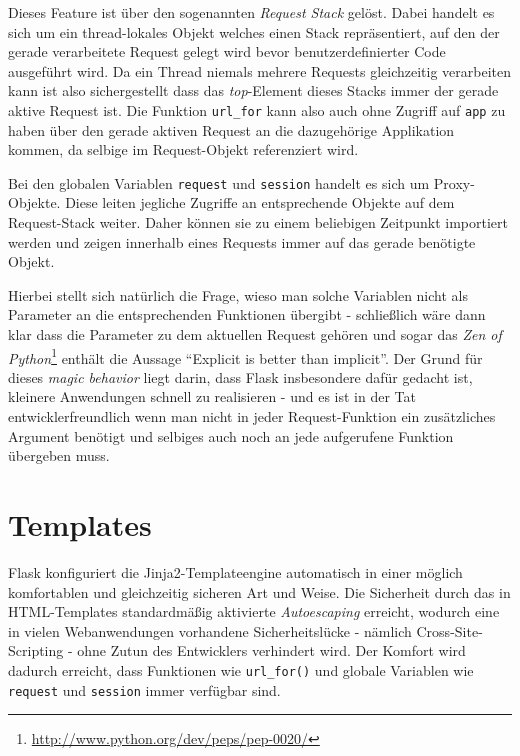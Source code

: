 Dieses Feature ist über den sogenannten \emph{Request Stack} gelöst. Dabei handelt es sich um ein
thread-lokales Objekt welches einen Stack repräsentiert, auf den der gerade verarbeitete Request
gelegt wird bevor benutzerdefinierter Code ausgeführt wird. Da ein Thread niemals mehrere Requests
gleichzeitig verarbeiten kann ist also sichergestellt dass das \emph{top}-Element dieses Stacks
immer der gerade aktive Request ist. Die Funktion \lstinline{url_for} kann also auch ohne Zugriff
auf \lstinline{app} zu haben über den gerade aktiven Request an die dazugehörige Applikation kommen,
da selbige im Request-Objekt referenziert wird.

Bei den globalen Variablen \lstinline{request} und \lstinline{session} handelt es sich um
Proxy-Objekte. Diese leiten jegliche Zugriffe an entsprechende Objekte auf dem Request-Stack weiter.
Daher können sie zu einem beliebigen Zeitpunkt importiert werden und zeigen innerhalb eines Requests
immer auf das gerade benötigte Objekt.

Hierbei stellt sich natürlich die Frage, wieso man solche Variablen nicht als Parameter an die
entsprechenden Funktionen übergibt - schließlich wäre dann klar dass die Parameter zu dem aktuellen
Request gehören und sogar das \emph{Zen of
Python}\footnote{\href{http://www.python.org/dev/peps/pep-0020/}{http://www.python.org/dev/peps/pep-0020/}}
enthält die Aussage \enquote{Explicit is better than implicit}. Der Grund für dieses \emph{magic
behavior} liegt darin, dass Flask insbesondere dafür gedacht ist, kleinere Anwendungen schnell zu
realisieren - und es ist in der Tat entwicklerfreundlich wenn man nicht in jeder Request-Funktion
ein zusätzliches Argument benötigt und selbiges auch noch an jede aufgerufene Funktion übergeben
muss.

\section{Templates}

Flask konfiguriert die Jinja2-Templateengine automatisch in einer möglich komfortablen und
gleichzeitig sicheren Art und Weise. Die Sicherheit durch das in HTML-Templates standardmäßig
aktivierte \emph{Autoescaping} erreicht, wodurch eine in vielen Webanwendungen vorhandene
Sicherheitslücke - nämlich Cross-Site-Scripting - ohne Zutun des Entwicklers verhindert wird. Der
Komfort wird dadurch erreicht, dass Funktionen wie \lstinline{url_for()} und globale Variablen wie
\lstinline{request} und \lstinline{session} immer verfügbar sind.


